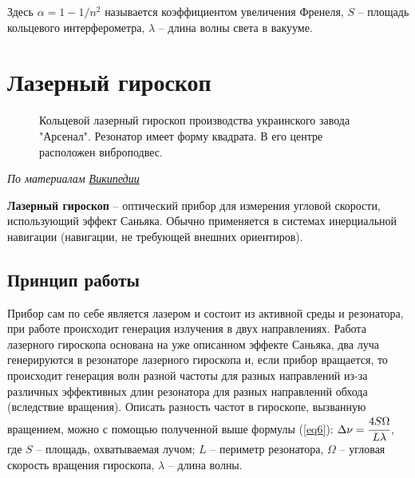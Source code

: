 \documentclass[a4paper, 12pt, openany]{book}
\begin{document}
	Здесь $\alpha = 1 - 1/n^2$ называется коэффициентом увеличения Френеля, $S$ -- площадь кольцевого интерферометра, $\lambda$ -- длина волны света в вакууме.
	
	\section{Лазерный гироскоп}
	\begin{figure}
		\caption{
			Кольцевой лазерный гироскоп производства украинского завода "Арсенал". Резонатор имеет форму квадрата. В его центре расположен виброподвес.
		}
		\label{pic2}
		\vspace{-30pt}
	\end{figure}
	\textit{ По материалам \href{https://ru.wikipedia.org/wiki/\%D0\%9B\%D0\%B0\%D0\%B7\%D0\%B5\%D1\%80\%D0\%BD\%D1\%8B\%D0\%B9\_\%D0\%B3\%D0\%B8\%D1\%80\%D0\%BE\%D1\%81\%D0\%BA\%D0\%BE\%D0\%BF}{Википедии}}
	
	\textbf{Лазерный гироскоп} -- оптический прибор для измерения угловой скорости, использующий эффект Саньяка. Обычно применяется в системах инерциальной навигации (навигации, не требующей внешних ориентиров).
	
	\subsection{Принцип работы}
	Прибор сам по себе является лазером и состоит из активной среды и резонатора, при работе происходит генерация излучения в двух направлениях. Работа лазерного гироскопа основана на уже описанном эффекте Саньяка, два луча генерируются в резонаторе лазерного гироскопа и, если прибор вращается, то происходит генерация волн разной частоты для разных направлений из-за различных эффективных длин резонатора для разных направлений обхода (вследствие вращения). Описать разность частот в гироскопе, вызванную вращением, можно с помощью полученной выше формулы (\ref{eq6}): $\Delta \nu = \cfrac{4 S \Omega}{L \lambda}$, где $S$ -- площадь, охватываемая лучом;  $L$ -- периметр резонатора, $\Omega$  -- угловая скорость вращения гироскопа, $\lambda$  -- длина волны.
	
\end{document}

